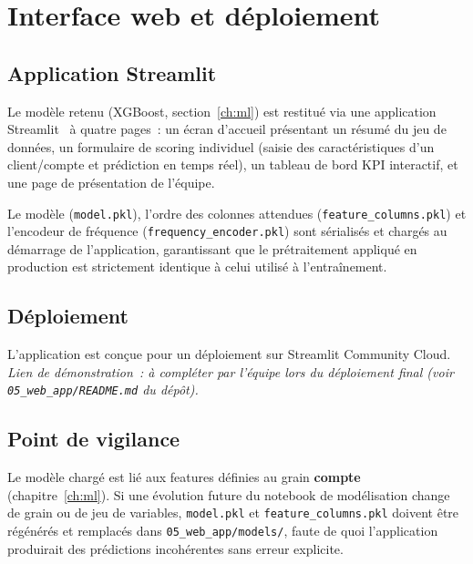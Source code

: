 \documentclass[11pt,a4paper]{report}
\begin{document}
\chapter{Interface web et d\'eploiement}
\label{ch:webapp}

\section{Application Streamlit}

Le mod\`ele retenu (XGBoost, section~\ref{ch:ml}) est restitu\'e via une
application Streamlit~\citep{streamlitdocs} \`a quatre pages~: un \'ecran
d'accueil pr\'esentant un r\'esum\'e du jeu de donn\'ees, un formulaire de
scoring individuel (saisie des caract\'eristiques d'un client/compte et
pr\'ediction en temps r\'eel), un tableau de bord KPI interactif, et une page
de pr\'esentation de l'\'equipe.

Le mod\`ele (\texttt{model.pkl}), l'ordre des colonnes attendues
(\texttt{feature\_columns.pkl}) et l'encodeur de fr\'equence
(\texttt{frequency\_encoder.pkl}) sont s\'erialis\'es et charg\'es au d\'emarrage de
l'application, garantissant que le pr\'etraitement appliqu\'e en production est
strictement identique \`a celui utilis\'e \`a l'entra\^inement.

\section{D\'eploiement}

L'application est con\c{c}ue pour un d\'eploiement sur Streamlit Community
Cloud. \emph{Lien de d\'emonstration~: \`a compl\'eter par l'\'equipe lors du
d\'eploiement final (voir \texttt{05\_web\_app/README.md} du d\'ep\^ot).}

\section{Point de vigilance}

Le mod\`ele charg\'e est li\'e aux features d\'efinies au grain \textbf{compte}
(chapitre~\ref{ch:ml}). Si une \'evolution future du notebook de mod\'elisation
change de grain ou de jeu de variables, \texttt{model.pkl} et
\texttt{feature\_columns.pkl} doivent \^etre r\'eg\'en\'er\'es et remplac\'es dans
\texttt{05\_web\_app/models/}, faute de quoi l'application produirait des
pr\'edictions incoh\'erentes sans erreur explicite.
\end{document}
